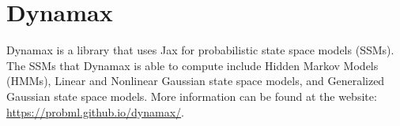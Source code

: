 \section*{Dynamax}
Dynamax is a library that uses Jax for probabilistic state space models (SSMs).
The SSMs that Dynamax is able to compute include Hidden Markov Models (HMMs), Linear and Nonlinear Gaussian state space models, and Generalized Gaussian state space models.
More information can be found at the website: \url{https://probml.github.io/dynamax/}.

 
 